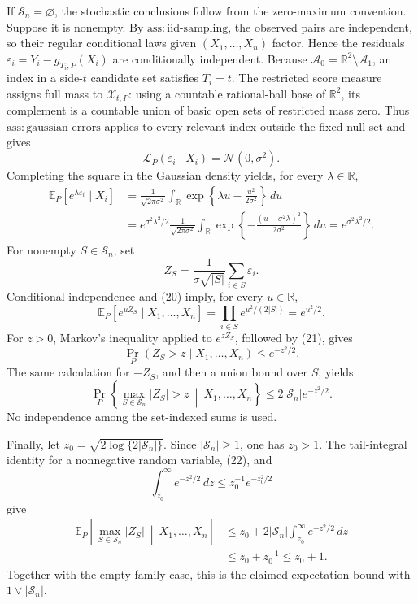 If \(\mathscr S_n=\varnothing\), the stochastic conclusions follow from the zero-maximum convention. Suppose it is nonempty. By \(\mathrm{ass:iid\text{-}sampling}\), the observed pairs are independent, so their regular conditional laws given \((X_1,\ldots,X_n)\) factor. Hence the residuals \(\varepsilon_i=Y_i-g_{T_i,P}(X_i)\) are conditionally independent. Because \(\mathcal A_0=\mathbb R^2\setminus\mathcal A_1\), an index in a side-\(t\) candidate set satisfies \(T_i=t\). The restricted score measure assigns full mass to \(\mathcal X_{t,P}\): using a countable rational-ball base of \(\mathbb R^2\), its complement is a countable union of basic open sets of restricted mass zero. Thus \(\mathrm{ass:gaussian\text{-}errors}\) applies to every relevant index outside the fixed null set and gives
\[
 \mathcal L_P(\varepsilon_i\mid X_i)=\mathcal N(0,\sigma^2).
\]
Completing the square in the Gaussian density yields, for every \(\lambda\in\mathbb R\),
\[
 \begin{aligned}
 \mathbb E_P[e^{\lambda\varepsilon_i}\mid X_i]
 &=\frac1{\sqrt{2\pi\sigma^2}}
 \int_{\mathbb R}\exp\left\{\lambda u-\frac{u^2}{2\sigma^2}\right\}\,du\\
 &=e^{\sigma^2\lambda^2/2}
 \frac1{\sqrt{2\pi\sigma^2}}
 \int_{\mathbb R}\exp\left\{-\frac{(u-\sigma^2\lambda)^2}{2\sigma^2}\right\}\,du
 =e^{\sigma^2\lambda^2/2}.
 \end{aligned} \tag{20}
\]
For nonempty \(S\in\mathscr S_n\), set
\[
 Z_S=\frac1{\sigma\sqrt{|S|}}\sum_{i\in S}\varepsilon_i.
\]
Conditional independence and (20) imply, for every \(u\in\mathbb R\),
\[
 \mathbb E_P[e^{uZ_S}\mid X_1,\ldots,X_n]
 =\prod_{i\in S}e^{u^2/(2|S|)}
 =e^{u^2/2}. \tag{21}
\]
For \(z>0\), Markov's inequality applied to \(e^{zZ_S}\), followed by (21), gives
\[
 \Pr_P(Z_S>z\mid X_1,\ldots,X_n)\le e^{-z^2/2}.
\]
The same calculation for \(-Z_S\), and then a union bound over \(S\), yields
\[
 \Pr_P\left\{\max_{S\in\mathscr S_n}|Z_S|>z
 \ \middle|\ X_1,\ldots,X_n\right\}
 \le2|\mathscr S_n|e^{-z^2/2}. \tag{22}
\]
No independence among the set-indexed sums is used.

Finally, let \(z_0=\sqrt{2\log\{2|\mathscr S_n|\}}\). Since \(|\mathscr S_n|\ge1\), one has \(z_0>1\). The tail-integral identity for a nonnegative random variable, (22), and
\[
 \int_{z_0}^{\infty}e^{-z^2/2}\,dz\le z_0^{-1}e^{-z_0^2/2}
\]
give
\[
 \begin{aligned}
 \mathbb E_P\left[\max_{S\in\mathscr S_n}|Z_S|\ \middle|\ X_1,\ldots,X_n\right]
 &\le z_0+2|\mathscr S_n|\int_{z_0}^{\infty}e^{-z^2/2}\,dz\\
 &\le z_0+z_0^{-1}\le z_0+1.
 \end{aligned}
\]
Together with the empty-family case, this is the claimed expectation bound with \(1\vee|\mathscr S_n|\).
